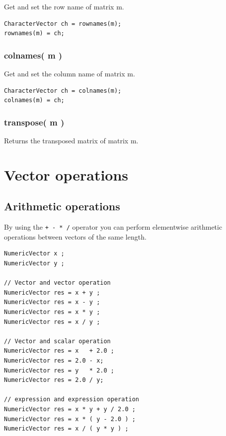 \documentclass[]{book}
\begin{document}
Get and set the row name of matrix m.

\begin{verbatim}
CharacterVector ch = rownames(m);
rownames(m) = ch;
\end{verbatim}

\hypertarget{colnames-m}{%
\subsection{colnames( m )}\label{colnames-m}}

Get and set the column name of matrix m.

\begin{verbatim}
CharacterVector ch = colnames(m);
colnames(m) = ch;
\end{verbatim}

\hypertarget{transpose-m}{%
\subsection{transpose( m )}\label{transpose-m}}

Returns the transposed matrix of matrix m.

\hypertarget{vector-operations}{%
\chapter{Vector operations}\label{vector-operations}}

\hypertarget{arithmetic-operations}{%
\section{Arithmetic operations}\label{arithmetic-operations}}

By using the \texttt{+\ -\ *\ /} operator you can perform elementwise arithmetic operations between vectors of the same length.

\begin{verbatim}
NumericVector x ;
NumericVector y ;

// Vector and vector operation
NumericVector res = x + y ;
NumericVector res = x - y ;
NumericVector res = x * y ;
NumericVector res = x / y ;

// Vector and scalar operation
NumericVector res = x   + 2.0 ;
NumericVector res = 2.0 - x;
NumericVector res = y   * 2.0 ;
NumericVector res = 2.0 / y;

// expression and expression operation
NumericVector res = x * y + y / 2.0 ;
NumericVector res = x * ( y - 2.0 ) ;
NumericVector res = x / ( y * y ) ;
\end{verbatim}
\end{document}
